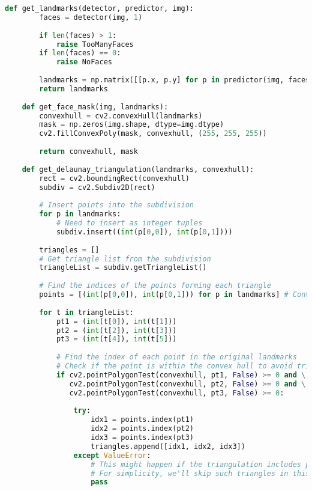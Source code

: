 \begin{lstlisting}[caption={student.py}, label={lst:code-example}, captionpos=t, language=python]
    def get_landmarks(detector, predictor, img):
        faces = detector(img, 1)
        
        if len(faces) > 1:
            raise TooManyFaces
        if len(faces) == 0:
            raise NoFaces
        
        landmarks = np.matrix([[p.x, p.y] for p in predictor(img, faces[0]).parts()])
        return landmarks
    
    def get_face_mask(img, landmarks):
        convexhull = cv2.convexHull(landmarks)
        mask = np.zeros(img.shape, dtype=img.dtype)
        cv2.fillConvexPoly(mask, convexhull, (255, 255, 255))
        
        return convexhull, mask
    
    def get_delaunay_triangulation(landmarks, convexhull):
        rect = cv2.boundingRect(convexhull)
        subdiv = cv2.Subdiv2D(rect)
    
        # Insert points into the subdivision
        for p in landmarks:
            # Need to insert as integer tuples
            subdiv.insert((int(p[0,0]), int(p[0,1])))
    
        triangles = []
        # Get triangle list from the subdivision
        triangleList = subdiv.getTriangleList()
    
        # Find the indices of the points forming each triangle
        points = [(int(p[0,0]), int(p[0,1])) for p in landmarks] # Convert landmarks to list of tuples for easier lookup
    
        for t in triangleList:
            pt1 = (int(t[0]), int(t[1]))
            pt2 = (int(t[2]), int(t[3]))
            pt3 = (int(t[4]), int(t[5]))
    
            # Find the index of each point in the original landmarks
            # Check if the point is within the convex hull to avoid triangles outside the face
            if cv2.pointPolygonTest(convexhull, pt1, False) >= 0 and \
               cv2.pointPolygonTest(convexhull, pt2, False) >= 0 and \
               cv2.pointPolygonTest(convexhull, pt3, False) >= 0:
    
                try:
                    idx1 = points.index(pt1)
                    idx2 = points.index(pt2)
                    idx3 = points.index(pt3)
                    triangles.append([idx1, idx2, idx3])
                except ValueError:
                    # This might happen if the triangulation includes points not exactly matching landmarks
                    # For simplicity, we'll skip such triangles in this example
                    pass
    

\end{lstlisting}
